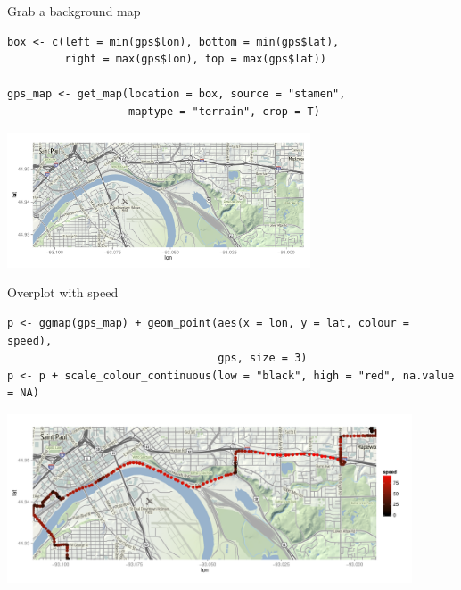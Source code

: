 \documentclass[sans,aspectratio=169,presentation,bigger,fleqn]{beamer}
\begin{document}
\begin{frame}[fragile,label=sec-24]{Grab a background map}
 \scriptsize

\begin{verbatim}
box <- c(left = min(gps$lon), bottom = min(gps$lat),
         right = max(gps$lon), top = max(gps$lat))

gps_map <- get_map(location = box, source = "stamen",
                   maptype = "terrain", crop = T)
\end{verbatim}

\begin{center}
\includegraphics[height=4cm]{./img/gps-map.pdf}
\end{center}
\end{frame}

\begin{frame}[fragile,label=sec-25]{Overplot with speed}
 \scriptsize

\begin{verbatim}
p <- ggmap(gps_map) + geom_point(aes(x = lon, y = lat, colour = speed),
                                 gps, size = 3)
p <- p + scale_colour_continuous(low = "black", high = "red", na.value = NA)
\end{verbatim}

\begin{center}
\includegraphics[height=5cm]{./img/gps-map-over.pdf}
\end{center}

\normalsize
\end{frame}
\end{document}
